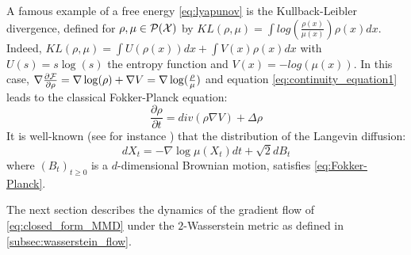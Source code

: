 \begin{remark} \label{rem:KL_Lyapunov}
	A famous example of a free energy \eqref{eq:lyapunov} is the Kullback-Leibler divergence, defined for $\rho, \mu \in \mathcal{P}({{\mathcal X}})$ by
	$KL(\rho,\mu)=\int log(\frac{\rho(x)}{\mu(x)})\rho(x)dx$. Indeed, $KL(\rho, \mu)=\int U(\rho(x))dx + \int V(x) \rho(x)dx$ with $U(s)=s\log(s)$ the entropy function and $V(x)=-log(\mu(x))$. In this case, $\nabla \frac{\partial {{\mathcal F}}}{\partial \rho}= \nabla \log(\rho) + \nabla V=  \nabla \log(\frac{\rho}{\mu})$ and equation \eqref{eq:continuity_equation1} leads to the classical Fokker-Planck equation:
	\begin{equation}\label{eq:Fokker-Planck}
	\frac{\partial{\rho}}{\partial t}= div(\rho \nabla V )+ \Delta \rho
	\end{equation}
It is well-known (see for instance \cite{jordan1998variational}) that the distribution of the Langevin diffusion:
	\begin{equation}\label{eq:langevin_diffusion}
	dX_t= -\nabla \log \mu (X_t)dt+\sqrt{2}dB_t
	\end{equation}
	where $(B_t)_{t\ge0}$ is a $d$-dimensional Brownian motion, satisfies \eqref{eq:Fokker-Planck}.
\end{remark}


The next section describes the dynamics of the gradient flow of \cref{eq:closed_form_MMD} under the $2$-Wasserstein metric as defined in \cref{subsec:wasserstein_flow}.
